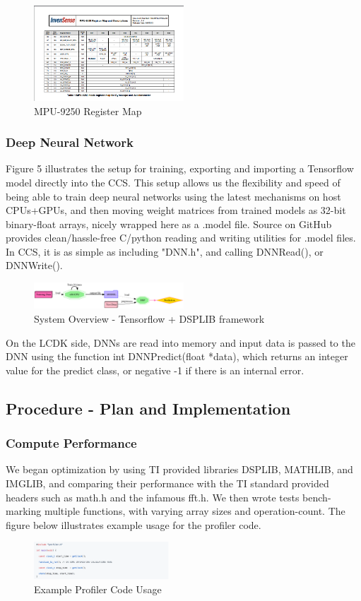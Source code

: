 \begin{figure}[h!]
  \caption{MPU-9250 Register Map}
  \includegraphics[width=0.5\textwidth]{images/reg.png}
\end{figure}

\subsubsection{Deep Neural Network}
Figure 5 illustrates the setup for training, exporting and importing a Tensorflow\cite{tensorflow} model directly into the CCS. This setup allows us the flexibility and speed of being able to train deep neural networks using the latest mechanisms on host CPUs+GPUs, and then moving weight matrices from trained models as 32-bit binary-float arrays, nicely wrapped here as a .model file. Source on GitHub provides clean/hassle-free C/python reading and writing utilities for .model files. In CCS, it is as simple as including "DNN.h", and calling DNNRead(), or DNNWrite().
\begin{figure}[h!]
  \caption{System Overview - Tensorflow + DSPLIB framework}
  \includegraphics[width=0.5\textwidth]{images/train.png}
\end{figure}
On the LCDK side, DNNs are read into memory and input data is passed to the DNN using the function int DNNPredict(float *data), which returns an integer value for the predict class, or negative -1 if there is an internal error.

\subsection{Procedure - Plan and Implementation}
\subsubsection{Compute Performance}
We began optimization by using TI provided libraries DSPLIB, MATHLIB, and IMGLIB, and comparing their performance with the TI standard provided headers such as math.h and the infamous fft.h. We then wrote tests bench-marking multiple functions, with varying array sizes and operation-count. The figure below illustrates example usage for the profiler code.
\begin{figure}[h!]
  \caption{Example Profiler Code Usage}
  \includegraphics[width=0.45\textwidth]{images/profiler.png}
\end{figure}

